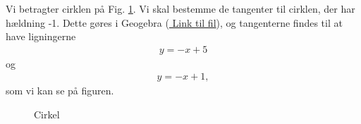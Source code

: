 \begin{exa}
Vi betragter cirklen på Fig. \ref{fig:cirkel2}. Vi skal bestemme de tangenter til cirklen, der har hældning -1. Dette gøres i Geogebra (\href{https://github.com/ChristianJLex/TeachingNotes/raw/master/Diverse/Geogebra/Cirkeltangenter.ggb}{\color{blue!60} Link til fil}), og tangenterne findes til at have ligningerne 
\begin{align*}
y = -x+5 
\end{align*}
og
\begin{align*}
y = -x +1, 
\end{align*}
som vi kan se på figuren.
\begin{figure}[H]
\centering
{}
\caption{Cirkel}
\label{fig:cirkel2}
\end{figure}
\end{exa}

